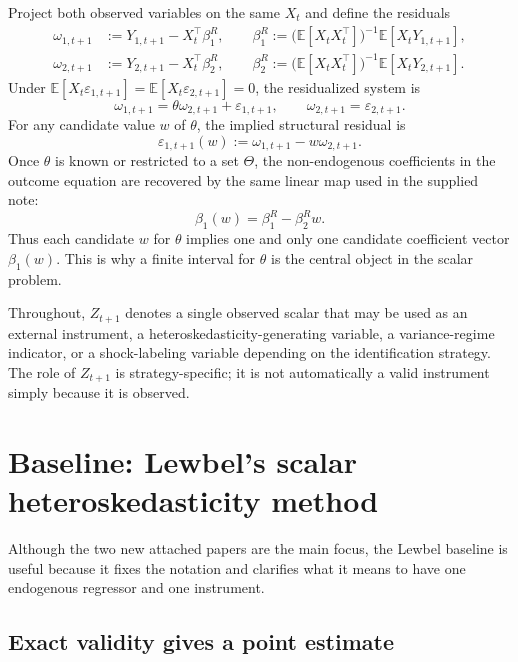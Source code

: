 \documentclass[11pt]{article}
\newcommand{\E}{\mathbb{E}}
\newcommand{\T}{\top}
\theoremstyle{plain}
\theoremstyle{definition}
\theoremstyle{remark}
\begin{document}
Project both observed variables on the same $X_t$ and define the residuals
\begin{align}
\omega_{1,t+1} &:= Y_{1,t+1}-X_t^\T\beta_1^R,\qquad
\beta_1^R:=\bigl(\E[X_tX_t^\T]\bigr)^{-1}\E[X_tY_{1,t+1}],\label{eq:W1}\\
\omega_{2,t+1} &:= Y_{2,t+1}-X_t^\T\beta_2^R,
\qquad
\beta_2^R:=\bigl(\E[X_tX_t^\T]\bigr)^{-1}\E[X_tY_{2,t+1}].\label{eq:W2}
\end{align}
Under $\E[X_t\varepsilon_{1,t+1}]=\E[X_t\varepsilon_{2,t+1}]=0$, the residualized
system is
\begin{equation}
\omega_{1,t+1}=\theta \omega_{2,t+1}+\varepsilon_{1,t+1},
\qquad
\omega_{2,t+1}=\varepsilon_{2,t+1}.
\label{eq:resid-system}
\end{equation}
For any candidate value $w$ of $\theta$, the implied structural residual is
\begin{equation}
\varepsilon_{1,t+1}(w):=\omega_{1,t+1}-w\omega_{2,t+1}.
\label{eq:cand-resid}
\end{equation}
Once $\theta$ is known or restricted to a set $\Theta$, the non-endogenous
coefficients in the outcome equation are recovered by the same linear map used
in the supplied note:
\begin{equation}
\beta_1(w)=\beta_1^R-\beta_2^R w.
\label{eq:beta-recovery}
\end{equation}
Thus each candidate $w$ for $\theta$ implies one and only one candidate
coefficient vector $\beta_1(w)$. This is why a finite interval for $\theta$ is the
central object in the scalar problem.

Throughout, $Z_{t+1}$ denotes a single observed scalar that may be used as an
external instrument, a heteroskedasticity-generating variable, a variance-regime
indicator, or a shock-labeling variable depending on the identification strategy.
The role of $Z_{t+1}$ is strategy-specific; it is not automatically a valid
instrument simply because it is observed.

\section{Baseline: Lewbel's scalar heteroskedasticity method}
\label{sec:lewbelbaseline}

Although the two new attached papers are the main focus, the Lewbel baseline is
useful because it fixes the notation and clarifies what it means to have one
endogenous regressor and one instrument.

\subsection{Exact validity gives a point estimate}
\end{document}
